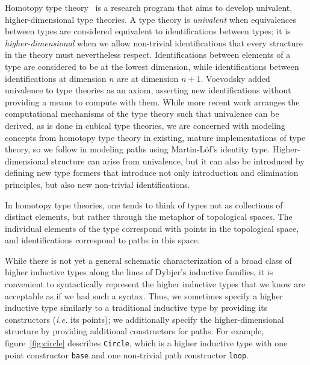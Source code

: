 \documentclass[sigplan,10pt]{acmart}
\begin{document}
Homotopy type theory~\cite{HoTT-2013} is a research program that aims to develop univalent, higher-dimensional type theories.
A type theory is \emph{univalent} when equivalences between types are considered equivalent to identifications between types; it is \emph{higher-dimensional} when we allow non-trivial identifications that every structure in the theory must nevertheless respect.
Identifications between elements of a type are considered to be at the lowest dimension, while identifications between identifications at dimension $n$ are at dimension $n+1$.
Voevodsky added univalence  to type theories as an axiom, asserting new identifications without providing a means to compute with them.
While more recent work arranges the computational mechanisms of the type theory such that univalence can be derived, as is done in cubical type theories, we are concerned with modeling concepts from homotopy type theory in existing, mature implementations of type theory, so we follow \citet{HoTT-2013} in modeling paths using Martin-Löf's identity type.
Higher-dimensional structure can arise from univalence, but it can also be introduced by defining new type formers that introduce not only introduction and elimination principles, but also new non-trivial identifications.

In homotopy type theories, one tends to think of types not as collections of distinct elements, but rather through the metaphor of topological spaces.
The individual elements of the type correspond with points in the topological space, and identifications correspond to paths in this space.



While there is not yet a general schematic characterization of a broad class of higher inductive types along the lines of Dybjer's inductive families, it is convenient to syntactically represent the higher inductive types that we know are acceptable as if we had such a syntax.
Thus, we sometimes specify a higher inductive type similarly to a traditional inductive type by providing its constructors (\textit{i.e.} its points); we additionally specify the higher-dimensional structure by providing additional constructors for paths. For example, figure~\ref{fig:circle} describes \Verb|Circle|, which is a higher inductive type with one point constructor \Verb|base| and one non-trivial path constructor \Verb|loop|.
\end{document}

